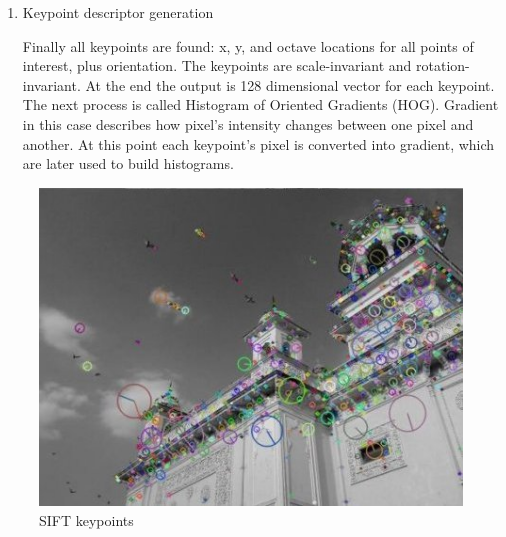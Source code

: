 \documentclass[a4paper, 11pt]{article}
\begin{document}
\begin{enumerate}
\item Keypoint descriptor generation

Finally all keypoints are found: x, y, and octave locations for all points of interest, plus orientation. The keypoints are scale-invariant and rotation-invariant. At the end the output is 128 dimensional vector for each keypoint. The next process is called Histogram of Oriented Gradients (HOG). Gradient in this case describes how pixel's intensity changes between one pixel and another. At this point each keypoint's pixel is converted into gradient, which are later used to build histograms.

\end{enumerate}

\begin{figure}[!htbp]
\includegraphics[scale=0.7]{sift_keypoints.jpg}
\centering
\caption{SIFT keypoints}
\end{figure}
\end{document}
